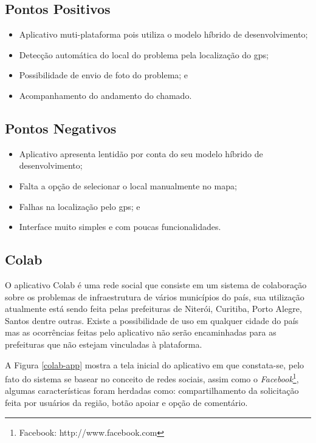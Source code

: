 \subsection*{Pontos Positivos}

\begin{itemize}
    \item Aplicativo muti-plataforma pois utiliza o modelo híbrido de desenvolvimento;
    \item Detecção automática do local do problema pela localização do \acrshort{gps};
    \item Possibilidade de envio de foto do problema; e
    \item Acompanhamento do andamento do chamado.
\end{itemize}

\subsection*{Pontos Negativos}

\begin{itemize}
    \item Aplicativo apresenta lentidão por conta do seu modelo híbrido de desenvolvimento;
    \item Falta a opção de selecionar o local manualmente no mapa;
    \item Falhas na localização pelo \acrshort{gps}; e
    \item Interface muito simples e com poucas funcionalidades.
\end{itemize}

\subsection{Colab}

\noindent O aplicativo Colab é uma rede social que consiste em um sistema de colaboração sobre os problemas de infraestrutura de vários municípios do país, sua utilização atualmente está sendo feita pelas prefeituras de Niterói, Curitiba, Porto Alegre, Santos dentre outras. Existe a possibilidade de uso em qualquer cidade do país mas as ocorrências feitas pelo aplicativo não serão encaminhadas para as prefeituras que não estejam vinculadas à plataforma.

A Figura \ref{colab-app} mostra a tela inicial do aplicativo em que constata-se, pelo fato do sistema se basear no conceito de redes sociais, assim como o \textit{Facebook}\footnote{Facebook: http://www.facebook.com}, algumas características foram herdadas como: compartilhamento da solicitação feita por usuários da região, botão apoiar e opção de comentário.

